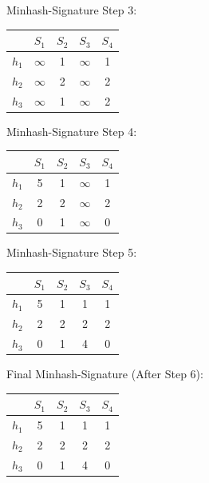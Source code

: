 \documentclass[]{scrartcl}
\begin{document}
\vspace{1cm}

Minhash-Signature Step 3:\\
\begin{tabular}{c||c|c|c|c}
	& $S_1$ & $S_2$ & $S_3$ &$S_4$  \\ 
	\hline \hline
	$h_1$	&  $\infty$ & 1 & $\infty$ & 1 \\ 
	\hline 
	$h_2$	&  $\infty$ & 2 & $\infty$ & 2 \\ 
	\hline 
	$h_3$	&  $\infty$ & 1 & $\infty$ & 2 \\ 
\end{tabular} 

\vspace{1cm}

Minhash-Signature Step 4:\\
\begin{tabular}{c||c|c|c|c}
			& $S_1$ & $S_2$ & $S_3$ &$S_4$  \\ 
	\hline \hline
	$h_1$	&  5 & 1 & $\infty$ & 1 \\ 
	\hline 
	$h_2$	&  2 & 2 & $\infty$ & 2 \\ 
	\hline 
	$h_3$	&  0 & 1 & $\infty$ & 0 \\ 
\end{tabular} 

\vspace{1cm}

Minhash-Signature Step 5:\\
\begin{tabular}{c||c|c|c|c}
	& $S_1$ & $S_2$ & $S_3$ &$S_4$  \\ 
	\hline \hline
	$h_1$	&  5 & 1 & 1 & 1 \\ 
	\hline 
	$h_2$	&  2 & 2 & 2 & 2 \\ 
	\hline 
	$h_3$	&  0 & 1 & 4 & 0 \\ 
\end{tabular} 

\vspace{1cm}

Final Minhash-Signature (After Step 6):\\
\begin{tabular}{c||c|c|c|c}
	& $S_1$ & $S_2$ & $S_3$ &$S_4$  \\ 
	\hline \hline
	$h_1$	&  5 & 1 & 1 & 1 \\ 
	\hline 
	$h_2$	&  2 & 2 & 2 & 2 \\ 
	\hline 
	$h_3$	&  0 & 1 & 4 & 0 \\ 
\end{tabular} 
\end{document}
